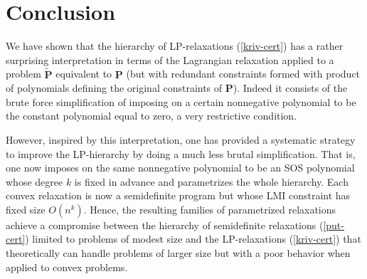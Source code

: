 \documentclass[11pt]{article}
\numberwithin{equation}{section}
\def\P{\mathbf{P}}
\begin{document}
 
 \section{Conclusion}
  
We have shown that the hierarchy of LP-relaxations (\ref{kriv-cert}) has a rather surprising 
interpretation in terms of the Lagrangian relaxation applied to
a problem $\tilde{\P}$ equivalent to $\P$ (but with redundant
constraints formed with product of polynomials defining the original constraints of $\P$).
Indeed it consists of the brute force simplification of imposing 
on a certain nonnegative polynomial to be the constant polynomial equal to zero, a very restrictive
condition.

However, inspired by this interpretation,  one has provided a systematic strategy
to improve the LP-hierarchy
by doing a much less brutal simplification. That is,
one now imposes on the same nonnegative polynomial to be an SOS polynomial 
whose degree $k$ is fixed in advance and parametrizes the whole hierarchy. Each convex relaxation is now a semidefinite program but 
whose LMI constraint has fixed size $O(n^k)$. Hence, the resulting families of parametrized relaxations achieve a compromise
between the hierarchy of semidefinite relaxations (\ref{put-cert}) limited to 
problems of modest size and the LP-relaxations (\ref{kriv-cert}) that theoretically can handle problems of 
larger size but with a poor behavior when applied to convex problems. 
\end{document}
